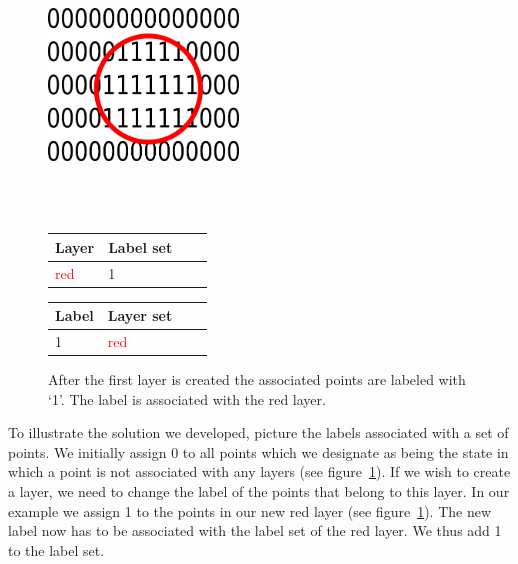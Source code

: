 \begin{figure}[ht]
	\begin{minipage}[b]{\linewidth}
		\centering
		\includegraphics[width=0.45\textwidth]{images/layers2}
	\end{minipage}
	\\\\
	\begin{minipage}[b]{0.49\linewidth}
		\hfill
		\begin{tabular}[b]{|l|l|l|l|}
			\hline
			Layer & Label set \\
			\hline
			\textcolor{red}{red}       & 1 \\
			\hline
		\end{tabular}
	\end{minipage}
	\hspace{0.5cm}
	\begin{minipage}[b]{0.5\linewidth}
		\begin{tabular}[b]{|l|l|l|l|}
			\hline
			Label & Layer set \\
			\hline
			1       & \textcolor{red}{red} \\
			\hline
		\end{tabular}
		\hfill
	\end{minipage}
	\caption[Label state after creation of the first layer.]{ After the first layer is created the associated points are labeled with `1'. The label is associated with the red layer. \label{fig:layer2}}
\end{figure}

To illustrate the solution we developed, picture the labels associated with a set of points. We initially assign 0 to all points which we designate as being the state in which a point is not associated with any layers (see figure~\ref{fig:layer2}). If we wish to create a layer, we need to change the label of the points that belong to this layer. In our example we assign 1 to the points in our new red layer (see figure~\ref{fig:layer2}). The new label now has to be associated with the label set of the red layer. We thus add 1 to the label set.


